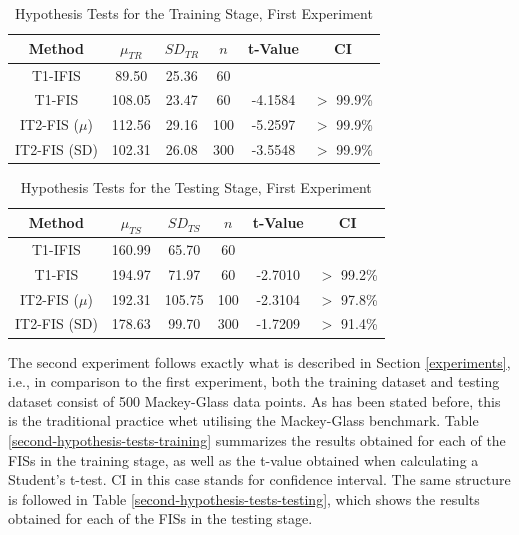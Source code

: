 \documentclass[conference]{IEEEtran}
\begin{document}
\begin{table}[!t]
  \renewcommand{\arraystretch}{1.3}
  \caption{Hypothesis Tests for the Training Stage, First Experiment}
  \label{first-hypothesis-tests-training}
  \centering
  \begin{tabular}{|c|c|c|c|c|c|}
    \hline
    Method & $\mu_{TR}$ & $SD_{TR}$ & $n$ & t-Value & CI \\
    \hline
    T1-IFIS & 89.50 & 25.36 & 60 &  & \\
    \hline
    T1-FIS & 108.05 & 23.47 & 60 & -4.1584 & $>$ 99.9\% \\
    \hline
    IT2-FIS (\(\mu\)) & 112.56 & 29.16 & 100 & -5.2597 & $>$ 99.9\% \\
    \hline
    IT2-FIS (SD) & 102.31 & 26.08 & 300 & -3.5548 & $>$ 99.9\% \\
    \hline
  \end{tabular}
\end{table}

\begin{table}[!t]
  \renewcommand{\arraystretch}{1.3}
  \caption{Hypothesis Tests for the Testing Stage, First Experiment}
  \label{first-hypothesis-tests-testing}
  \centering
  \begin{tabular}{|c|c|c|c|c|c|}
    \hline
    Method & $\mu_{TS}$ & $SD_{TS}$ & $n$ & t-Value & CI \\
    \hline
    T1-IFIS & 160.99 & 65.70 & 60 &  & \\
    \hline
    T1-FIS & 194.97 & 71.97 & 60 & -2.7010 & $>$ 99.2\%\\
    \hline
    IT2-FIS (\(\mu\)) & 192.31 & 105.75 & 100 & -2.3104 & $>$ 97.8\% \\
    \hline
    IT2-FIS (SD) & 178.63 & 99.70 & 300 & -1.7209 & $>$ 91.4\% \\
    \hline
  \end{tabular}
\end{table}

The second experiment follows exactly what is described in Section
\ref{experiments}, i.e., in comparison to the first experiment, both the
training dataset and testing dataset consist of 500 Mackey-Glass data
points. As has been stated before, this is the traditional practice
whet utilising the Mackey-Glass benchmark. Table
\ref{second-hypothesis-tests-training} summarizes the results obtained
for each of the FISs in the training stage, as well as the t-value
obtained when calculating a Student's t-test. CI in this case stands
for confidence interval. The same structure is followed in Table
\ref{second-hypothesis-tests-testing}, which shows the
results obtained for each of the FISs in the testing stage.
\end{document}
